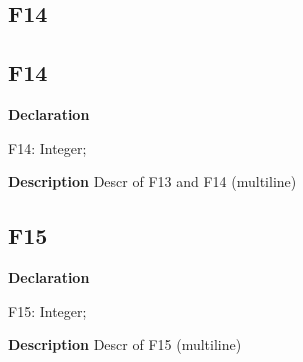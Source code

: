 \documentclass{report}
\newif\ifpdf
\begin{document}
\subsection*{\large{\textbf{F14}}\normalsize\hspace{1ex}\hrulefill}
\else
\subsection*{F14}
\fi
\label{ok_multiple_fields-F14}
\begin{list}{}{
\setlength{\itemindent}{0cm}
\setlength{\listparindent}{0cm}
\setlength{\leftmargin}{\evensidemargin}
\addtolength{\leftmargin}{\tmplength}
\settowidth{\labelsep}{X}
\addtolength{\leftmargin}{\labelsep}
\setlength{\labelwidth}{\tmplength}
}
\item[\textbf{Declaration}\hfill]
\ifpdf
\begin{flushleft}
\fi
\begin{ttfamily}
F14: Integer;\end{ttfamily}

\ifpdf
\end{flushleft}
\fi

\par
\item[\textbf{Description}]
Descr of F13 and F14 (multiline)

\end{list}
\ifpdf
\subsection*{\large{\textbf{F15}}\normalsize\hspace{1ex}\hrulefill}
\else
\subsection*{F15}
\fi
\label{ok_multiple_fields-F15}
\begin{list}{}{
\setlength{\itemindent}{0cm}
\setlength{\listparindent}{0cm}
\setlength{\leftmargin}{\evensidemargin}
\addtolength{\leftmargin}{\tmplength}
\settowidth{\labelsep}{X}
\addtolength{\leftmargin}{\labelsep}
\setlength{\labelwidth}{\tmplength}
}
\item[\textbf{Declaration}\hfill]
\ifpdf
\begin{flushleft}
\fi
\begin{ttfamily}
F15: Integer;\end{ttfamily}

\ifpdf
\end{flushleft}
\fi

\par
\item[\textbf{Description}]
Descr of F15 (multiline)

\end{list}
\end{document}
